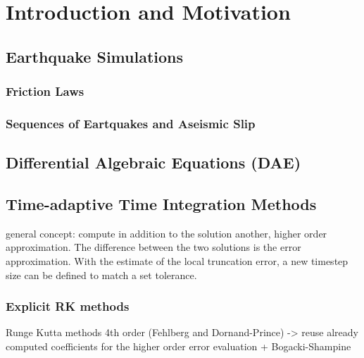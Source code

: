\chapter{Introduction and Motivation}
\section{Earthquake Simulations}
\subsection{Friction Laws}
\subsection{Sequences of Eartquakes and Aseismic Slip}
\section{Differential Algebraic Equations (DAE)}
\section{Time-adaptive Time Integration Methods}
general concept: compute in addition to the solution another, higher order approximation. The difference between the two solutions is the error approximation.
With the estimate of the local truncation error, a new timestep size can be defined to match a set tolerance.
\subsection{Explicit RK methods}
Runge Kutta methods 4th order (Fehlberg and Dornand-Prince) -> reuse already computed coefficients for the higher order error evaluation
+ Bogacki-Shampine
